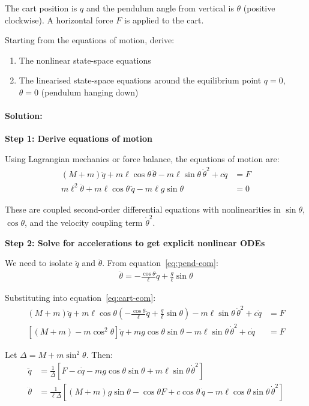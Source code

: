 \documentclass[11pt,a4paper]{article}
\begin{document}
The cart position is $q$ and the pendulum angle from vertical is $\theta$ (positive clockwise). A horizontal force $F$ is applied to the cart.

Starting from the equations of motion, derive:
\begin{enumerate}
\item The nonlinear state-space equations
\item The linearised state-space equations around the equilibrium point $q = 0$, $\theta = 0$ (pendulum hanging down)
\end{enumerate}

\paragraph{Solution:}

\textbf{Step 1: Derive equations of motion}

Using Lagrangian mechanics or force balance, the equations of motion are:
\begin{align}
(M + m)\ddot{q} + m\ell\cos\theta\,\ddot{\theta} - m\ell\sin\theta\,\dot{\theta}^2 + c\dot{q} &= F \label{eq:cart-eom}\\
m\ell^2\ddot{\theta} + m\ell\cos\theta\,\ddot{q} - m\ell g\sin\theta &= 0 \label{eq:pend-eom}
\end{align}

These are coupled second-order differential equations with nonlinearities in $\sin\theta$, $\cos\theta$, and the velocity coupling term $\dot{\theta}^2$.

\textbf{Step 2: Solve for accelerations to get explicit nonlinear ODEs}

We need to isolate $\ddot{q}$ and $\ddot{\theta}$. From equation~\eqref{eq:pend-eom}:
\begin{align}
\ddot{\theta} = -\frac{\cos\theta}{\ell}\ddot{q} + \frac{g}{\ell}\sin\theta
\end{align}

Substituting into equation~\eqref{eq:cart-eom}:
\begin{align}
(M + m)\ddot{q} + m\ell\cos\theta\left(-\frac{\cos\theta}{\ell}\ddot{q} + \frac{g}{\ell}\sin\theta\right) - m\ell\sin\theta\,\dot{\theta}^2 + c\dot{q} &= F\\
\left[(M + m) - m\cos^2\theta\right]\ddot{q} + mg\cos\theta\sin\theta - m\ell\sin\theta\,\dot{\theta}^2 + c\dot{q} &= F
\end{align}

Let $\Delta = M + m\sin^2\theta$. Then:
\begin{align}
\ddot{q} &= \frac{1}{\Delta}\left[F - c\dot{q} - mg\cos\theta\sin\theta + m\ell\sin\theta\,\dot{\theta}^2\right]\\
\ddot{\theta} &= \frac{1}{\ell\Delta}\left[(M+m)g\sin\theta - \cos\theta F + c\cos\theta\,\dot{q} - m\ell\cos\theta\sin\theta\,\dot{\theta}^2\right]
\end{align}
\end{document}
